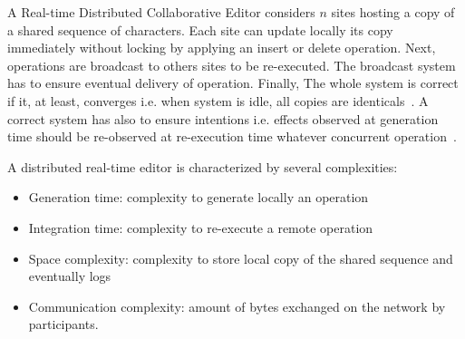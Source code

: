 A Real-time Distributed Collaborative Editor considers $n$ sites
hosting a copy of a shared sequence of characters. Each site can
update locally its copy immediately without locking by applying an
insert or delete operation. Next, operations are broadcast to others
sites to be re-executed. The broadcast system has to ensure eventual
delivery of operation. Finally, The whole system is correct if it, at
least, converges i.e. when system is idle, all copies are
identicals~\cite{bailis2013eventual}. A correct system has also to
ensure intentions i.e. effects observed at generation time should be
re-observed at re-execution time whatever concurrent
operation~\cite{sun1998achieving}.

A distributed real-time editor is characterized by several
complexities:
\begin{itemize}
\item Generation time: complexity to generate locally an operation
\item Integration time: complexity to re-execute a remote operation
\item Space complexity: complexity to store local copy of the shared
  sequence and eventually logs
\item Communication complexity: amount of bytes exchanged on the
  network by participants. 
\end{itemize}


